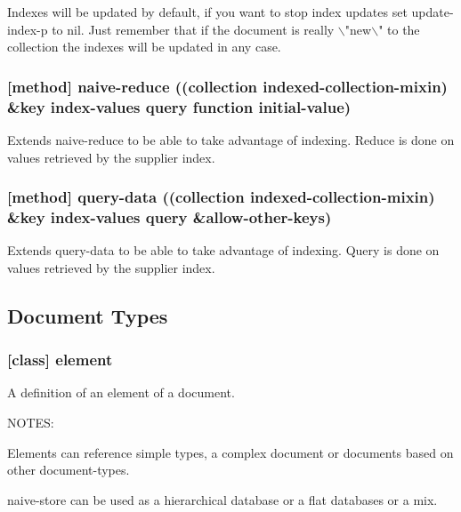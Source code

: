 \documentclass[11pt]{article}
\begin{document}
Indexes will be updated by default, if you want to stop index updates
set update-index-p to nil. Just remember that if the document is
really $\backslash$"new$\backslash$" to the collection the indexes will be updated in any
case.

\subsubsection{[method] naive-reduce ((collection indexed-collection-mixin) \&key index-values query function initial-value)}
\label{sec:orgf69c101}

Extends naive-reduce to be able to take advantage of indexing. Reduce
is done on values retrieved by the supplier index.

\subsubsection{[method] query-data ((collection indexed-collection-mixin) \&key index-values query \&allow-other-keys)}
\label{sec:orgbaef21e}

Extends query-data to be able to take advantage of indexing. Query is
done on values retrieved by the supplier index.

\subsection{Document Types}
\label{sec:org87cb44e}

\subsubsection{[class] element}
\label{sec:org84b1e1a}

A definition of an element of a document.

NOTES:

Elements can reference simple types, a complex document or documents
based on other document-types.

naive-store can be used as a hierarchical database or a flat databases
or a mix.
\end{document}

